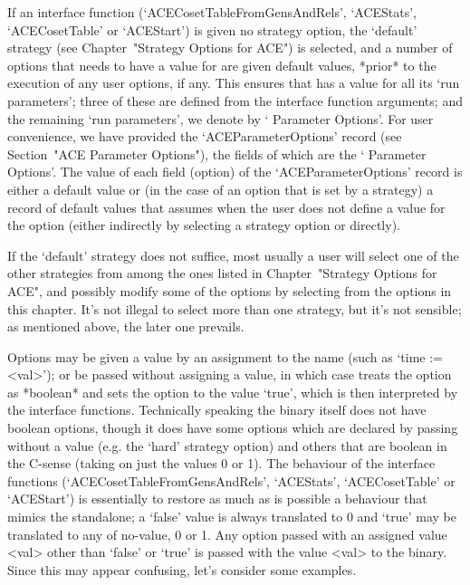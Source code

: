 
If  an  {\ACE}  interface  function   (`ACECosetTableFromGensAndRels',
`ACEStats',  `ACECosetTable'  or  `ACEStart')  is  given  no  strategy
option, the `default'  strategy  (see  Chapter~"Strategy  Options  for
ACE") is selected, and a number of options that {\ACE} needs to have a
value for are given default values, *prior* to the  execution  of  any
user options, if any. This ensures that {\ACE} has a value for all its
\lq{}run parameters'; three of  these  are  defined  from  the  {\ACE}
interface function arguments; and the remaining \lq{}run  parameters',
we denote by \lq{}{\ACE} Parameter Options'. For user convenience,  we
have  provided  the  `ACEParameterOptions'  record  (see  Section~"ACE
Parameter Options"), the fields of which are the \lq{}{\ACE} Parameter
Options'.   The   value   of    each    field    (option)    of    the
`ACEParameterOptions' record is either a default value or (in the case
of an option that is set by a strategy) a  record  of  default  values
that {\ACE} assumes when the user does not  define  a  value  for  the
option (either indirectly by selecting a strategy option or directly).

If the `default' strategy does not suffice, most usually a  user  will
select one of the other strategies  from  among  the  ones  listed  in
Chapter~"Strategy Options for ACE", and possibly modify  some  of  the
options by selecting from  the  options  in  this  chapter.  It's  not
illegal to select more than one strategy, but it's  not  sensible;  as
mentioned above, the later one prevails.


Options may be given a value by an assignment to  the  name  (such  as
`time := <val>'); or be passed without assigning  a  value,  in  which
case {\GAP} treats the option as *boolean* and sets the option to  the
value `true', which  is  then  interpreted  by  the  {\ACE}  interface
functions. Technically speaking the {\ACE} binary itself does not have
boolean options, though it does have some options which  are  declared
by passing without a value  (e.g.  the  `hard'  strategy  option)  and
others that are boolean in the C-sense (taking on just the values 0 or
1).   The   behaviour    of    the    {\ACE}    interface    functions
(`ACECosetTableFromGensAndRels',   `ACEStats',   `ACECosetTable'    or
`ACEStart') is essentially  to  restore  as  much  as  is  possible  a
behaviour that mimics the {\ACE} standalone; a `false' value is always
translated to 0 and `true' may be translated to any of no-value, 0  or
1. Any option passed with an assigned value <val> other  than  `false'
or `true' is passed with the value <val> to the {\ACE}  binary.  Since
this may appear confusing, let's consider some examples.

